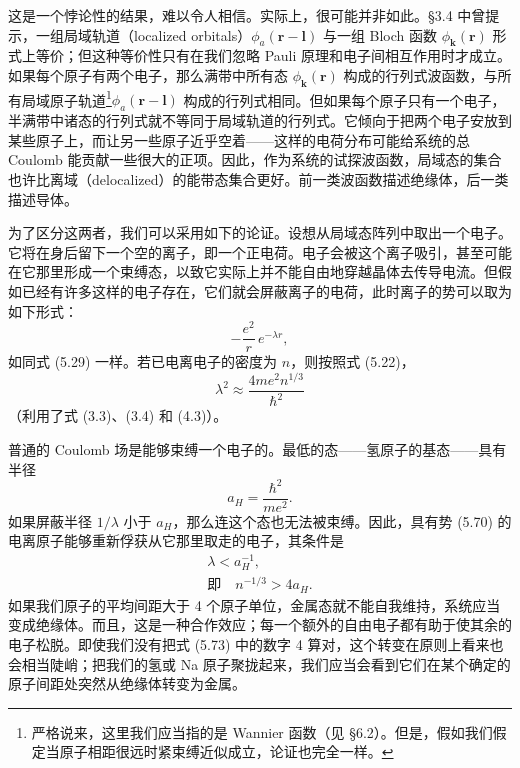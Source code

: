 这是一个悖论性的结果，难以令人相信。实际上，很可能并非如此。§3.4 中曾提示，一组局域轨道（localized orbitals）$\phi_{a}(\mathbf{r}-\mathbf{l})$ 与一组 Bloch 函数 $\phi_{\mathbf{k}}(\mathbf{r})$ 形式上等价；但这种等价性只有在我们忽略 Pauli 原理和电子间相互作用时才成立。如果每个原子有两个电子，那么满带中所有态 $\phi_{\mathbf{k}}(\mathbf{r})$ 构成的行列式波函数，与所有局域原子轨道\footnote{严格说来，这里我们应当指的是 Wannier 函数（见 §6.2）。但是，假如我们假定当原子相距很远时紧束缚近似成立，论证也完全一样。}$\phi_{a}(\mathbf{r}-\mathbf{l})$ 构成的行列式相同。但如果每个原子只有一个电子，半满带中诸态的行列式就不等同于局域轨道的行列式。它倾向于把两个电子安放到某些原子上，而让另一些原子近乎空着——这样的电荷分布可能给系统的总 Coulomb 能贡献一些很大的正项。因此，作为系统的试探波函数，局域态的集合也许比离域（delocalized）的能带态集合更好。前一类波函数描述绝缘体，后一类描述导体。

为了区分这两者，我们可以采用如下的论证。设想从局域态阵列中取出一个电子。它将在身后留下一个空的离子，即一个正电荷。电子会被这个离子吸引，甚至可能在它那里形成一个束缚态，以致它实际上并不能自由地穿越晶体去传导电流。但假如已经有许多这样的电子存在，它们就会屏蔽离子的电荷，此时离子的势可以取为如下形式：
\begin{equation*}
-\frac{e^{2}}{r}\,e^{-\lambda r}, \tag{5.70}
\end{equation*}
如同式 (5.29) 一样。若已电离电子的密度为 $n$，则按照式 (5.22)，
\begin{equation*}
\lambda^{2}\approx\frac{4me^{2}n^{1/3}}{\hbar^{2}} \tag{5.71}
\end{equation*}
（利用了式 (3.3)、(3.4) 和 (4.3)）。

普通的 Coulomb 场是能够束缚一个电子的。最低的态——氢原子的基态——具有半径
\begin{equation*}
a_{H}=\frac{\hbar^{2}}{me^{2}}. \tag{5.72}
\end{equation*}
如果屏蔽半径 $1/\lambda$ 小于 $a_{H}$，那么连这个态也无法被束缚。因此，具有势 (5.70) 的电离原子能够重新俘获从它那里取走的电子，其条件是
\begin{gather*}
\lambda<a_{H}^{-1}, \\
\text{即}\quad n^{-1/3}>4a_{H}. \tag{5.73}
\end{gather*}
如果我们原子的平均间距大于 4 个原子单位，金属态就不能自我维持，系统应当变成绝缘体。而且，这是一种合作效应；每一个额外的自由电子都有助于使其余的电子松脱。即使我们没有把式 (5.73) 中的数字 4 算对，这个转变在原则上看来也会相当陡峭；把我们的氢或 Na 原子聚拢起来，我们应当会看到它们在某个确定的原子间距处突然从绝缘体转变为金属。

